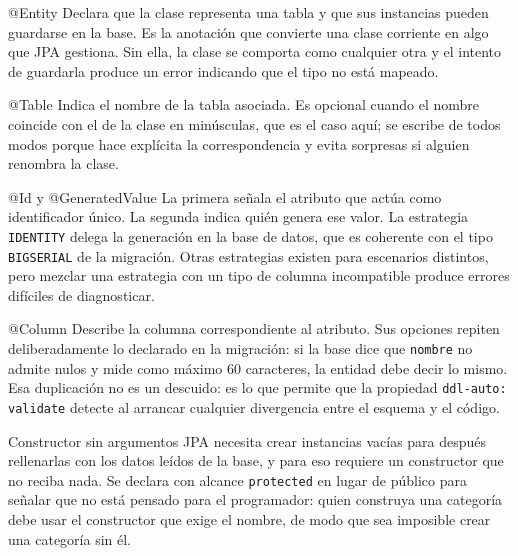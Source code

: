 \documentclass[11pt,a4paper,openany]{book}
\begin{document}
\begin{cajadefinicion}{@Entity}
	Declara que la clase representa una tabla y que sus instancias pueden guardarse en la base. Es la anotación que convierte una clase corriente en algo que JPA gestiona. Sin ella, la clase se comporta como cualquier otra y el intento de guardarla produce un error indicando que el tipo no está mapeado.
\end{cajadefinicion}

\begin{cajadefinicion}{@Table}
	Indica el nombre de la tabla asociada. Es opcional cuando el nombre coincide con el de la clase en minúsculas, que es el caso aquí; se escribe de todos modos porque hace explícita la correspondencia y evita sorpresas si alguien renombra la clase.
\end{cajadefinicion}

\begin{cajadefinicion}{@Id y @GeneratedValue}
	La primera señala el atributo que actúa como identificador único. La segunda indica quién genera ese valor. La estrategia \texttt{IDENTITY} delega la generación en la base de datos, que es coherente con el tipo \texttt{BIGSERIAL} de la migración. Otras estrategias existen para escenarios distintos, pero mezclar una estrategia con un tipo de columna incompatible produce errores difíciles de diagnosticar.
\end{cajadefinicion}

\begin{cajadefinicion}{@Column}
	Describe la columna correspondiente al atributo. Sus opciones repiten deliberadamente lo declarado en la migración: si la base dice que \texttt{nombre} no admite nulos y mide como máximo 60 caracteres, la entidad debe decir lo mismo. Esa duplicación no es un descuido: es lo que permite que la propiedad \texttt{ddl-auto: validate} detecte al arrancar cualquier divergencia entre el esquema y el código.
\end{cajadefinicion}

\begin{cajadefinicion}{Constructor sin argumentos}
	JPA necesita crear instancias vacías para después rellenarlas con los datos leídos de la base, y para eso requiere un constructor que no reciba nada. Se declara con alcance \texttt{protected} en lugar de público para señalar que no está pensado para el programador: quien construya una categoría debe usar el constructor que exige el nombre, de modo que sea imposible crear una categoría sin él.
\end{cajadefinicion}
\end{document}
